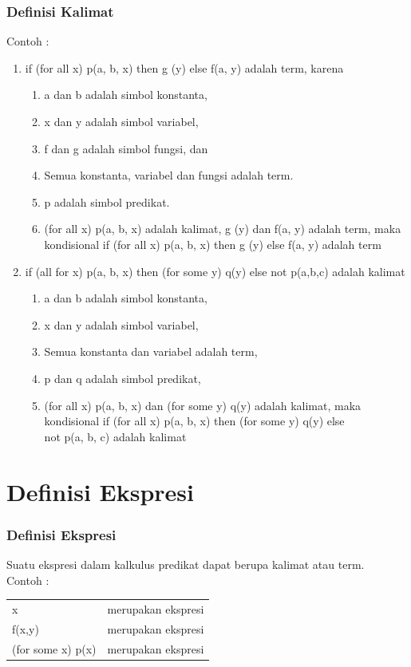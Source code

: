 \documentclass[handout]{beamer}
\theoremstyle{definition}
\theoremstyle{example}
\begin{document}
\begin{frame}
	\frametitle{Definisi Kalimat}
	Contoh :\\
	\begin{enumerate} 
		\item  if (for all x) p(a, b, x) then g (y) else f(a, y) adalah term, karena
			\begin{enumerate} 
				\item  a dan b adalah simbol konstanta,
				\item  x dan y adalah simbol variabel,
				\item  f dan g adalah simbol fungsi, dan
				\item  Semua konstanta, variabel dan fungsi adalah term.
				\item  p adalah simbol predikat.
				\item  (for all x) p(a, b, x) adalah kalimat, g (y) dan f(a, y) adalah term, maka kondisional if (for all x) p(a, b, x) then g (y) else f(a, y) adalah term
		     \end{enumerate}
		     
		\item  if (all for x) p(a, b, x) then (for some y) q(y) else not p(a,b,c) adalah kalimat
		 \begin{enumerate} 
		 	\item  a dan b adalah simbol konstanta,
		 	\item  x dan y adalah simbol variabel,
		 	\item  Semua konstanta dan variabel adalah term,
		 	\item  p dan q adalah simbol predikat,
		 	\item  (for all x) p(a, b, x) dan (for some y) q(y) adalah kalimat, 
		 	maka \\kondisional if (for all x) p(a, b, x) then (for some y) q(y) else \\not p(a, b, c) adalah kalimat 
		 \end{enumerate}    
    \end{enumerate}
	
\end{frame}	

\section{Definisi Ekspresi}
\begin{frame}
	\frametitle{Definisi Ekspresi}
     Suatu ekspresi dalam kalkulus predikat dapat berupa kalimat atau term.\\
     Contoh :\\
	  \begin{tabular}{ l l }	
		x        &         merupakan ekspresi\\
		f(x,y)   &         merupakan ekspresi\\
		(for some x) p(x) & merupakan ekspresi
	 \end{tabular}	
\end{frame}
\end{document}
